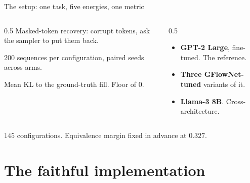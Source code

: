 \documentclass{beamer}
\begin{document}
\begin{frame}{The setup: one task, five energies, one metric}
  \begin{columns}[T]
    \begin{column}{0.5\textwidth}
      \small
       Masked-token recovery: corrupt tokens, ask the sampler to put them back.
      \vspace{0.3em}

      $200$ sequences per configuration, paired seeds across arms.
      \vspace{0.6em}

       Mean KL to the ground-truth fill. Floor of $0$.
    \end{column}
    \begin{column}{0.5\textwidth}
      \small
      \begin{itemize}\small
        \item \textbf{GPT-2 Large}, fine-tuned. The reference.
        \item \textbf{Three GFlowNet-tuned} variants of it.
        \item \textbf{Llama-3 8B}. Cross-architecture.
      \end{itemize}
    \end{column}
  \end{columns}
  \vspace{0.8em}
  \begin{center}{\footnotesize $145$ configurations. Equivalence margin fixed in advance at $0.327$.}\end{center}
\end{frame}

\section{The faithful implementation}
\end{document}
